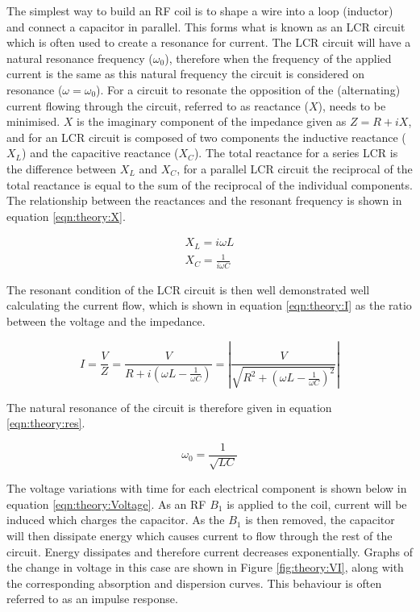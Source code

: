 The simplest way to build an \ac{RF} coil is to shape a wire into a loop (inductor) and connect a capacitor in parallel. This forms what is known as an LCR circuit which is often used to create a resonance for current. The LCR circuit will have a natural resonance frequency ($\omega_0$), therefore when the frequency of the applied current is the same as this natural frequency the circuit is considered on resonance ($\omega=\omega_0$). For a circuit to resonate the opposition of the (alternating) current flowing through the circuit, referred to as reactance ($X$), needs to be minimised. $X$ is the imaginary component of the impedance given as $Z = R+iX$, and for an LCR circuit is composed of two components the inductive reactance ($X_L$) and the capacitive reactance ($X_C$). The total reactance for a series LCR is the difference between $X_L$ and $X_C$, for a parallel LCR circuit the reciprocal of the total reactance is equal to the sum of the reciprocal of the individual components. The relationship between the reactances and the resonant frequency is shown in equation \ref{eqn:theory:X}.

\begin{equation}
\begin{gathered}
    X_L = i\omega L \\
    X_C = \frac{1}{i\omega C}
    \label{eqn:theory:X}
\end{gathered}
\end{equation}

The resonant condition of the LCR circuit is then well demonstrated well calculating the current flow, which is shown in equation \ref{eqn:theory:I} as the ratio between the voltage and the impedance.

\begin{equation}
    I = \frac{V}{Z} = \frac{V}{R+i(\omega L - \frac{1}{\omega C})} = \left| \frac{V}{\sqrt{R^2+(\omega L - \frac{1}{\omega C})^2}} \right|
    \label{eqn:theory:I}
\end{equation}

The natural resonance of the circuit is therefore given in equation \ref{eqn:theory:res}.

\begin{equation}
    \omega_0 = \frac{1}{\sqrt{LC}}
    \label{eqn:theory:res}
\end{equation}

The voltage variations with time for each electrical component is shown below in equation \ref{eqn:theory:Voltage}. As an \ac{RF} $B_1$ is applied to the coil, current will be induced which charges the capacitor. As the $B_1$ is then removed, the capacitor will then dissipate energy which causes current to flow through the rest of the circuit. Energy dissipates and therefore current decreases exponentially. Graphs of the change in voltage in this case are shown in Figure \ref{fig:theory:VI}, along with the corresponding absorption and dispersion curves. This behaviour is often referred to as an impulse response.


